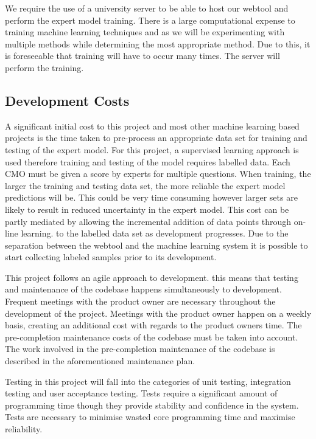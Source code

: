 \documentclass{ecmm427_assignment}
\begin{document}
We require the use of a university server to be able to host our webtool and perform the expert model training. There is a large computational expense to training machine learning techniques and as we will be experimenting with multiple methods while determining the most appropriate method. Due to this, it is foreseeable that training will have to occur many times. The server will perform the training.


\subsection{Development Costs}
 A significant initial cost to this project and most other machine learning based projects is the time taken to pre-process an appropriate data set for training and testing of the expert model. For this project, a supervised learning approach is used therefore training and testing of the model requires labelled data. Each CMO must be given a score by experts for multiple questions. When training, the larger the training and testing data set, the more reliable the expert model predictions will be. This could be very time consuming however larger sets are likely to result in reduced uncertainty in the expert model. This cost can be partly mediated by allowing the incremental addition of data points through on-line learning. to the labelled data set as development progresses. Due to the separation between the webtool and the machine learning system it is possible to start collecting labeled samples prior to its development.

 This project follows an agile approach to development. this means that testing and maintenance of the codebase happens simultaneously to development. Frequent meetings with the product owner are necessary throughout the development of the project. Meetings with the product owner happen on a weekly basis, creating an additional cost with regards to the product owners time.  The pre-completion maintenance costs of the codebase must be taken into account. The work involved in the pre-completion maintenance of the codebase is described in the aforementioned maintenance plan. 
 
 Testing in this project will fall into the categories of unit testing, integration testing and user acceptance testing. Tests require a significant amount of programming time though they provide stability and confidence in the system. Tests are necessary to minimise wasted core programming time and maximise reliability.
\end{document}
